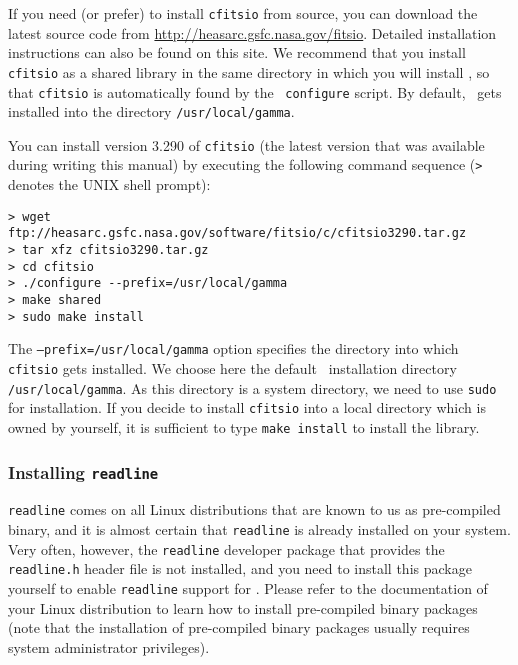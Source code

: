 \documentclass{article}[12pt,a4]
\begin{document}
If you need (or prefer) to install {\tt cfitsio} from source, you can download the latest source
code from \url{http://heasarc.gsfc.nasa.gov/fitsio}.
Detailed installation instructions can also be found on this site.
We recommend that you install {\tt cfitsio} as a shared library in the same directory in which
you will install \this, so that {\tt cfitsio} is automatically found by the \this\ {\tt configure} script.
By default, \this\ gets installed into the directory {\tt /usr/local/gamma}.

You can install version 3.290 of {\tt cfitsio} (the latest version that was available during writing 
this manual) by executing the following command sequence 
({\tt >} denotes the UNIX shell prompt):
\begin{verbatim}
> wget ftp://heasarc.gsfc.nasa.gov/software/fitsio/c/cfitsio3290.tar.gz
> tar xfz cfitsio3290.tar.gz
> cd cfitsio
> ./configure --prefix=/usr/local/gamma
> make shared
> sudo make install
\end{verbatim}
The {\tt --prefix=/usr/local/gamma} option specifies the directory into which {\tt cfitsio} gets
installed.
We choose here the default \this\ installation directory {\tt /usr/local/gamma}.
As this directory is a system directory, we need to use {\tt sudo} for installation.
If you decide to install {\tt cfitsio} into a local directory which is owned by yourself, it
is sufficient to type {\tt make install} to install the library.

\subsubsection{Installing {\tt readline}}

{\tt readline} comes on all Linux distributions that are known to us as pre-compiled binary, 
and it is almost certain that {\tt readline} is already installed on your system.
Very often, however, the {\tt readline} developer package that provides the {\tt readline.h}
header file is not installed, and you need to install this package yourself to enable
{\tt readline} support for \this.
Please refer to the documentation of your Linux distribution to learn how to install
pre-compiled binary packages (note that the installation of pre-compiled binary packages 
usually requires system administrator privileges).
\end{document}
